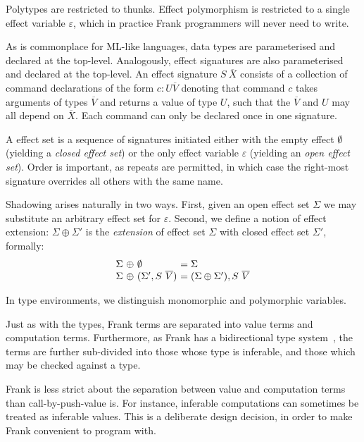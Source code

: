 \documentclass[preprint]{sigplanconf}
\newcommand{\many}{\overline}
\newcommand\ba{\begin{array}}
\newcommand\ea{\end{array}}
\newcommand{\sig}{S}
\newcommand{\sigs}{\Sigma}
\begin{document}
Polytypes are restricted to thunks. Effect polymorphism is restricted
to a single effect variable $\varepsilon$, which in practice Frank
programmers will never need to write.

As is commonplace for ML-like languages, data types are parameterised
and declared at the top-level. Analogously, effect signatures are also
parameterised and declared at the top-level. An effect signature
$S~\many{X}$ consists of a collection of command declarations of the
form $c:U{\many{V}}$ denoting that command $c$ takes arguments of
types $\many{V}$ and returns a value of type $U$, such that the
$\many{V}$ and $U$ may all depend on $\many{X}$. Each command can only
be declared once in one signature.

A effect set is a sequence of signatures initiated either with the
empty effect $\emptyset$ (yielding a \emph{closed effect set}) or the only
effect variable $\varepsilon$ (yielding an \emph{open effect set}). Order
is important, as repeats are permitted, in which case the right-most
signature overrides all others with the same name.

Shadowing arises naturally in two ways. First, given an open effect
set $\sigs$ we may substitute an arbitrary effect set for
$\varepsilon$. Second, we define a notion of effect extension: $\sigs
\oplus \sigs'$ is the \emph{extension} of effect set $\sigs$ with
closed effect set $\sigs'$, formally:
%
\[\ba{@{\sigs~\oplus~}l@{~}l@{}}
\emptyset               &= \sigs \\
(\sigs', \sig~\many{V}) &= (\sigs \oplus \sigs'), \sig~\many{V} \\
\ea\]

In type environments, we distinguish monomorphic and polymorphic
variables.

Just as with the types, Frank terms are separated into value terms and
computation terms. Furthermore, as Frank has a bidirectional type
system~\cite{PierceT00}, the terms are further sub-divided into those
whose type is inferable, and those which may be checked against a
type.

Frank is less strict about the separation between value and
computation terms than call-by-push-value is. For instance, inferable
computations can sometimes be treated as inferable values. This is a
deliberate design decision, in order to make Frank convenient to
program with.

\end{document}
